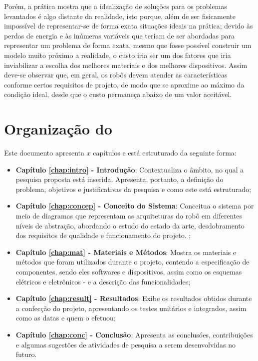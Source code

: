 Porém, a prática mostra que a idealização de soluções para os problemas levantados é algo distante da realidade, isto porque, além de ser fisicamente impossível de representar-se de forma exata situações ideais na prática; devido às perdas de energia e às inúmeras variáveis que teriam de ser abordadas para representar um problema de forma exata, mesmo que fosse possível construir um modelo muito próximo a realidade, o custo iria ser um dos fatores que iria inviabilizar a escolha dos melhores materiais e dos melhores dispositivos. Assim deve-se observar que, em geral, os robôs devem atender as características conforme certos requisitos de projeto, de modo que se aproxime ao máximo da condição ideal, desde que o custo permaneça abaixo de um valor aceitável. 

\section{Organização do \thetypework}
\label{section:organizacao}

Este documento apresenta $x$ capítulos e está estruturado da seguinte forma:

\begin{itemize}

  \item \textbf{Capítulo \ref{chap:intro} - Introdução}: Contextualiza o âmbito, no qual a pesquisa proposta está inserida. Apresenta, portanto, a definição do problema, objetivos e justificativas da pesquisa e como este \thetypeworkthree está estruturado;

  \item \textbf{Capítulo \ref{chap:concep} - Conceito do Sistema}: Conceitua o sistema por meio de diagramas que representam as arquiteturas do robô em diferentes níveis de abstração, abordando o estudo do estado da arte, desdobramento dos requisitos de qualidade e funcionamento do projeto.
  ;

  \item \textbf{Capítulo \ref{chap:mat} - Materiais e Métodos}: Mostra os materiais e métodos que foram utilizados durante o projeto, contendo a especificação de componentes, sendo eles softwares e dispositivos, assim como os esquemas elétricos e eletrônicos - e a descrição das funcionalidades;
  
  \item \textbf{Capítulo \ref{chap:result} - Resultados}: Exibe os resultados obtidos durante a confecção do projeto, apresentando os testes unitários e integrados, assim como as datas e quem o efetuou;
  

  \item \textbf{Capítulo \ref{chap:conc} - Conclusão}: Apresenta as conclusóes, contribuições
  e algumas sugestões de atividades de pesquisa a serem desenvolvidas no futuro.

\end{itemize}

